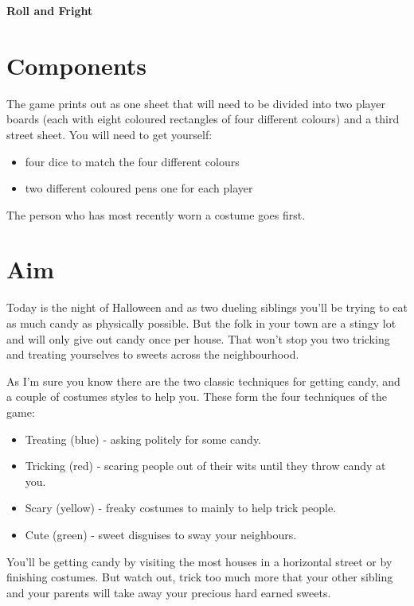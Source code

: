 \documentclass{article}
\begin{document}
\centerline{\bfseries\Huge{Roll and Fright}}
\begin{multicols}{3}
\section*{Components}

The game prints out as one sheet that will need to be divided into two player boards (each with eight coloured rectangles of four different colours) and a third street sheet.
You will need to get yourself:
\begin{itemize}
    \itemsep0em 
    \item four dice to match the four different colours
    \item two different coloured pens one for each player
\end{itemize}
The person who has most recently worn a costume goes first.

\section*{Aim}
Today is the night of Halloween and as two dueling siblings you'll be trying to eat as much candy as physically possible. But the folk in your town are a stingy lot and will only give out candy once per house. That won't stop you two tricking and treating yourselves to sweets across the neighbourhood.

As I'm sure you know there are the two classic techniques for getting candy, and a couple of costumes styles to help you. These form the four techniques of the game:
\begin{itemize}
    \itemsep0em 
    \item \textcolor{treatblue}{Treating} (blue) - asking politely for some candy.
    \item \textcolor{trickred}{Tricking} (red) - scaring people out of their wits until they throw candy at you.
    \item \textcolor{scaryellow}{Scary} (yellow) - freaky costumes to mainly to help trick people.
    \item \textcolor{cutegreen}{Cute} (green) - sweet disguises to sway your neighbours.
\end{itemize}

You'll be getting candy by visiting the most houses in a horizontal street or by finishing costumes. But watch out, trick too much more that your other sibling and your parents will take away your precious hard earned sweets.


\end{multicols}
\end{document}
